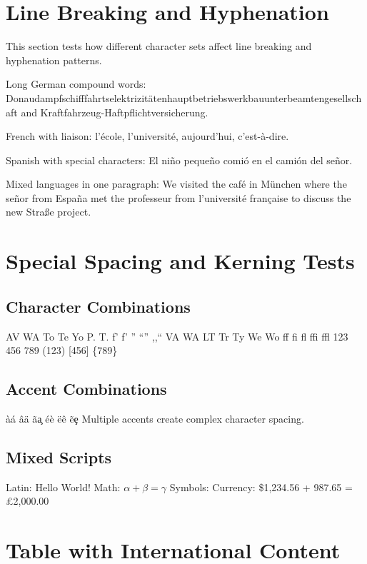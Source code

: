 \documentclass[12pt]{article}
\begin{document}
\section{Line Breaking and Hyphenation}

This section tests how different character sets affect line breaking and hyphenation patterns.

Long German compound words: Donaudampfschifffahrtselektrizit\"atenhauptbetriebswerkbauunterbeamtengesellschaft and Kraftfahrzeug-Haftpflichtversicherung.

French with liaison: l'\'ecole, l'universit\'e, aujourd'hui, c'est-\`a-dire.

Spanish with special characters: El ni\~no peque\~no comi\'o en el cami\'on del se\~nor.

Mixed languages in one paragraph: We visited the caf\'e in M\"unchen where the se\~nor from Espa\~na met the professeur from l'universit\'e fran\c{c}aise to discuss the new Stra\ss{}e project.

\section{Special Spacing and Kerning Tests}

\subsection{Character Combinations}
AV WA To Te Yo P. T. f' f' '' ``'' ,,``
VA WA LT Tr Ty We Wo ff fi fl ffi ffl
123 456 789 (123) [456] \{789\}

\subsection{Accent Combinations}
\`a\'a \^a\"a \~a\c{a} \'e\`e \"e\^e \~e\c{e}
Multiple accents create complex character spacing.

\subsection{Mixed Scripts}
Latin: Hello World!
Math: $\alpha + \beta = \gamma$
Symbols: \textcopyright{} \texttrademark{} \textregistered{}
Currency: \$1,234.56 + \texteuro{}987.65 = \pounds{}2,000.00

\section{Table with International Content}
\end{document}
